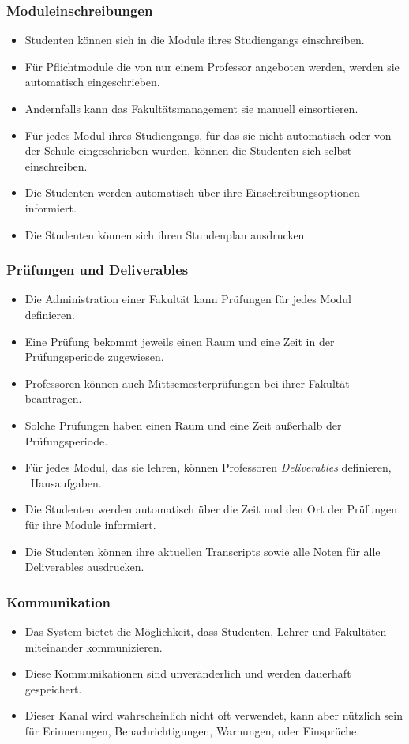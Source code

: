 \documentclass[aspectratio=169,mathserif,notheorems]{beamer}%
\begin{document}
%
\begin{frame}%
\frametitle{Moduleinschreibungen}%
\begin{itemize}%
\item Studenten können sich in die Module ihres Studiengangs einschreiben.%
%
\item<2-> Für Pflichtmodule die von nur einem Professor angeboten werden, werden sie automatisch eingeschrieben.%
%
\item<3-> Andernfalls kann das Fakultätsmanagement sie manuell einsortieren.%
%
\item<4-> Für jedes Modul ihres Studiengangs, für das sie nicht automatisch oder von der Schule eingeschrieben wurden, können die Studenten sich selbst einschreiben.%
%
\item<5-> Die Studenten werden automatisch über ihre Einschreibungsoptionen informiert.%
%
\item<6-> Die Studenten können sich ihren Stundenplan ausdrucken.%
\end{itemize}%
\end{frame}%
%
\begin{frame}%
\frametitle{Prüfungen und Deliverables}%
\begin{itemize}%
\item Die Administration einer Fakultät kann Prüfungen für jedes Modul definieren.%
%
\item<2-> Eine Prüfung bekommt jeweils einen Raum und eine Zeit in der Prüfungsperiode zugewiesen.%
%
\item<3-> Professoren können auch Mittsemesterprüfungen bei ihrer Fakultät beantragen.%
%
\item<4-> Solche Prüfungen haben einen Raum und eine Zeit außerhalb der Prüfungsperiode.%
%
\item<5-> Für jedes Modul, das sie lehren, können Professoren \emph{Deliverables} definieren, \DEzB\ Hausaufgaben.%
%
\item<6-> Die Studenten werden automatisch über die Zeit und den Ort der Prüfungen für ihre Module informiert.%
%
\item<7-> Die Studenten können ihre aktuellen Transcripts sowie alle Noten für alle Deliverables ausdrucken.%
\end{itemize}%
\end{frame}%
%
\begin{frame}%
\frametitle{Kommunikation}%
\begin{itemize}%
\item Das System bietet die Möglichkeit, dass Studenten, Lehrer und Fakultäten miteinander kommunizieren.%
%
\item<2-> Diese Kommunikationen sind unveränderlich und werden dauerhaft gespeichert.%
%
\item<3-> Dieser Kanal wird wahrscheinlich nicht oft verwendet, kann aber nützlich sein für Erinnerungen, Benachrichtigungen, Warnungen, oder Einsprüche.%
\end{itemize}%
\end{frame}%
\end{document}
